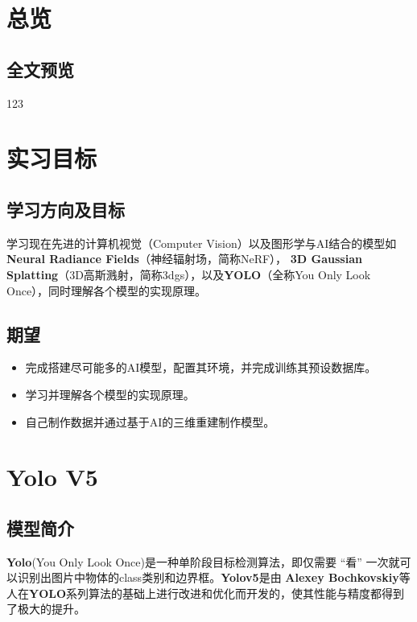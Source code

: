 \documentclass{nwputhesis}
\begin{document}
\maketitle

\newpage
\makecontent

\maketext
\fancyfoot[C]{\thepage}
\pagestyle{fancy}
\section{总览}
\subsection{全文预览}
123
\makespace
\section{实习目标}
\subsection{学习方向及目标}
学习现在先进的计算机视觉（Computer Vision）以及图形学与AI结合的模型如\textbf{Neural Radiance Fields}（神经辐射场，简称NeRF），
\textbf{3D Gaussian Splatting}（3D高斯溅射，简称3dgs），以及\textbf{YOLO}（全称You Only Look Once），同时理解各个模型的实现原理。
\subsection{期望}
\begin{itemize}
    \item 完成搭建尽可能多的AI模型，配置其环境，并完成训练其预设数据库。
    \item 学习并理解各个模型的实现原理。
    \item 自己制作数据并通过基于AI的三维重建制作模型。
\end{itemize}
\makespace
\section{Yolo V5}
\subsection{模型简介}
\textbf{Yolo}(You Only Look Once)是一种单阶段目标检测算法，即仅需要 “看” 一次就可以识别出图片中物体的class类别和边界框。\textbf{Yolov5}是由
\textbf{Alexey Bochkovskiy}等人在\textbf{YOLO}系列算法的基础上进行改进和优化而开发的，使其性能与精度都得到了极大的提升。
\end{document}
